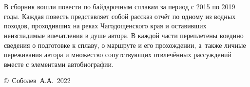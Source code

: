 \chapter*{}

В сборник вошли повести по байдарочным сплавам за период с 2015 по 2019 годы. Каждая повесть представляет собой рассказ отчёт по одному из водных походов, проходивших на реках Чагодощенского края и оставивших неизгладимые впечатления в душе автора. В каждой части переплетены воедино сведения о подготовке к сплаву, о маршруте и его прохождении, а~также личные переживания автора и множество сопутствующих отвлечённых рассуждений вместе с элементами автобиографии.

\vspace{\fill}
\begin{flushright}
	\copyright~Соболев~А.А.~2022
\end{flushright}
